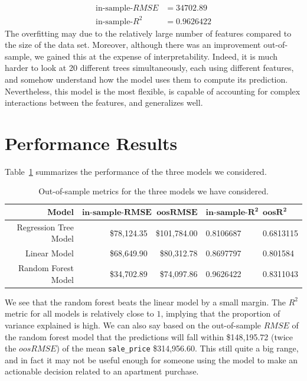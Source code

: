\documentclass[11pt]{article}
\begin{document}
	\begin{align*}
		\text{in-sample-}RMSE &= 34702.89\\
		\text{in-sample-}R^2 &= 0.9626422
	\end{align*}
	The overfitting may due to the relatively large number of features
	compared to the size of the data set. Moreover, although there
	was an improvement out-of-sample, we gained this at the expense
	of interpretability. Indeed, it is much harder to
	look at 20 different trees simultaneously, each using different features,
	and somehow understand how the model uses them to compute its prediction.
	Nevertheless, this model is the most flexible, is capable of accounting
	for complex interactions between the features, and generalizes well.
	
	\section{Performance Results}
	Table~\ref{tbl:oos-metrics-all-models} summarizes the performance of
	the three models we considered.
	\begin{table}
		\centering
		\begin{tabular}{|r|r|r|l|l|}
			\hline
			\textbf{Model} & $\mathbf{\textbf{in-sample-} RMSE}$ & $\mathbf{oosRMSE}$ &  $\mathbf{\textbf{in-sample-}R^2}$ &$\mathbf{oosR^2}$\\
			\hline
			Regression Tree Model & \$78,124.35 & \$101,784.00 & 0.8106687 & 0.6813115 \\
			\hline
			Linear Model & \$68,649.90  &\$80,312.78 & 0.8697797   & 0.801584\\
			\hline
			Random Forest Model & \$34,702.89 & \$74,097.86 & 0.9626422 & 0.8311043 \\
			\hline
		\end{tabular}
		\caption{Out-of-sample metrics for the three models we have considered.}
		\label{tbl:oos-metrics-all-models}
	\end{table}
	We see that the random forest beats the linear model by a small
	margin. The $R^2$ metric for all models is relatively close to $1$,
	implying that the proportion of variance explained is high.
	We can also say based on the out-of-sample $RMSE$ of the random forest
	model that the predictions will fall within \$148,195.72 (twice
	the $oosRMSE$) of the mean \verb|sale_price| \$314,956.60. This still
	quite a big range, and in fact it may not be useful enough for
	someone using the model to make an actionable decision related to
	an apartment purchase.
	
\end{document}
